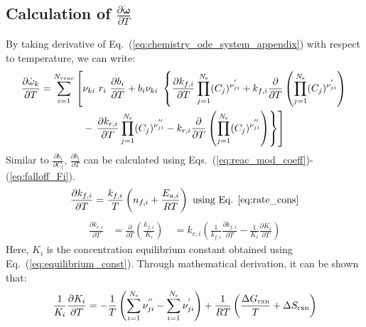 \subsection*{Calculation of $\frac{\partial \mathbf{\dot{\omega}}}{\partial T}$}
By taking derivative of Eq.~(\ref{eq:chemistry_ode_system_appendix}) with respect to temperature, we can write:
\begin{multline}\label{eq:Jac2nd}
\frac{\partial \dot{\omega}_k}{\partial T} = \sum_{i=1}^{N_{reac}} \left[ \nu_{ki} \ r_i \ \frac{\partial b_i}{\partial T} +  b_i \nu_{ki} \  \left\{  \frac{\partial k_{f,i}}{\partial T} \prod_{j=1}^{N_{\rm s}} (C_j)^{{\nu}_{ji}^{'}}  + k_{f,i} \frac{\partial}{\partial T} \left( \prod_{j=1}^{N_{\rm s}} (C_j)^{{\nu}_{ji}^{'}}  \right) \right. \right. \\
- \left. \left. \frac{\partial k_{r,i}}{\partial T} \prod_{j=1}^{N_{\rm s}} (C_j)^{{\nu}_{ji}^{''}}  - k_{r,i} \frac{\partial}{\partial T} \left( \prod_{j=1}^{N_{\rm s}} (C_j)^{{\nu}_{ji}^{''}}  \right) \right\} \right]
\end{multline}
Similar to $\frac{\partial b_i}{\partial C_l}$, $\frac{\partial b_i}{\partial T}$ can be calculated using Eqs.~(\ref{eq:reac_mod_coeff})-(\ref{eq:falloff_Fi}).
\begin{equation} \label{eq:kfTmpDerivative}
\frac{\partial k_{f,i}}{\partial T} = \frac{k_{f,i}}{T} \left( n_{f,i} + \frac{E_{a,i}}{RT} \right) \ \text{using Eq. \ref{eq:rate_cons}}
\end{equation}
\begin{equation}\label{eq:krTmpDerivative}
\begin{aligned}
\frac{\partial k_{r,i}}{\partial T} &= \frac{\partial}{\partial T} \left( \frac{k_{f,i}}{K_i}  \right) \
&= k_{r,i} \left( \frac{1}{k_{f,i}} \frac{\partial k_{f,i}}{\partial T} - \frac{1}{K_i} \frac{\partial K_i}{\partial T} \right)
\end{aligned}
\end{equation}
Here, $K_i$ is the concentration equilibrium constant obtained using Eq.~(\ref{eq:equilibrium_const}). Through mathematical derivation, it can be shown that:
\begin{equation}\label{eq:EqConstTmpDerivative}
\begin{aligned}
\frac{1}{K_i} \frac{\partial K_i}{\partial T} = -\frac{1}{T} \left( \sum_{i=1}^{N_{\rm s}} {\nu}_{ji}^{''} -  \sum_{i=1}^{N_{\rm s}} {\nu}_{ji}^{'}  \right) + \frac{1}{R T} \left(  \frac{\Delta G_{\mathrm{rxn}}}{T} + \Delta S_{\mathrm{rxn}}   \right)
\end{aligned}
\end{equation}
